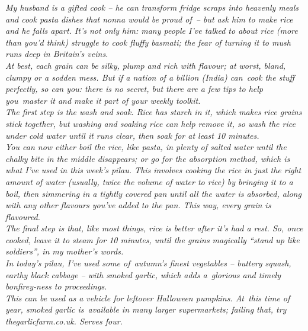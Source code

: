 \documentclass{book}
\begin{document}
\emph{My husband is a gifted cook – he can transform fridge scraps into heavenly meals and cook pasta dishes that nonna would be proud of – but ask him to make rice and he falls apart. It’s not only him: many people I’ve talked to about rice (more than you’d think) struggle to cook fluffy basmati; the fear of turning it to mush runs deep in Britain’s veins.\\ 
At best, each grain can be silky, plump and rich with flavour; at worst, bland, clumpy or a sodden mess. But if a nation of a billion (India) can cook the stuff perfectly, so can you: there is no secret, but there are a few tips to help you master it and make it part of your weekly toolkit.\\ 
The first step is the wash and soak. Rice has starch in it, which makes rice grains stick together, but washing and soaking rice can help remove it, so wash the rice under cold water until it runs clear, then soak for at least 10 minutes.\\ 
You can now either boil the rice, like pasta, in plenty of salted water until the chalky bite in the middle disappears; or go for the absorption method, which is what I’ve used in this week’s pilau. This involves cooking the rice in just the right amount of water (usually, twice the volume of water to rice) by bringing it to a boil, then simmering in a tightly covered pan until all the water is absorbed, along with any other flavours you’ve added to the pan. This way, every grain is flavoured.\\ 
The final step is that, like most things, rice is better after it’s had a rest. So, once cooked, leave it to steam for 10 minutes, until the grains magically “stand up like soldiers”, in my mother’s words.\\ 
In today’s pilau, I’ve used some of autumn’s finest vegetables – buttery squash, earthy black cabbage – with smoked garlic, which adds a glorious and timely bonfirey-ness to proceedings.\\ 
This can be used as a vehicle for leftover Halloween pumpkins. At this time of year, smoked garlic is available in many larger supermarkets; failing that, try thegarlicfarm.co.uk. Serves four.}\\\\ 
\end{document}
